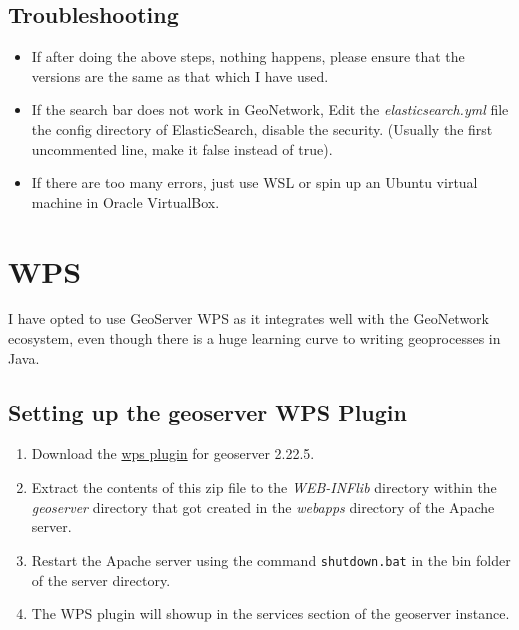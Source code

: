 \documentclass{article}
\begin{document}
        \subsection*{Troubleshooting}
            \begin{itemize}
                \item If after doing the above steps, nothing happens, please ensure that the versions are the same as that which I have used.
                \item If the search bar does not work in GeoNetwork, Edit the \emph{elasticsearch.yml} file the config directory of ElasticSearch, disable the security. (Usually the first uncommented line, make it false instead of true).
                \item If there are too many errors, just use WSL or spin up an Ubuntu virtual machine in Oracle VirtualBox.
            \end{itemize}
    \section*{WPS}
    \hspace{1.5em}I have opted to use GeoServer WPS as it integrates well with the GeoNetwork ecosystem, even though there is a huge learning curve to writing geoprocesses in Java.
        \subsection*{Setting up the geoserver WPS Plugin}
            \begin{enumerate}
                \item Download the \href{https://sourceforge.net/projects/geoserver/files/GeoServer/2.22.5/extensions/geoserver-2.22.5-wps-plugin.zip}{wps plugin} for geoserver 2.22.5.
                \item Extract the contents of this zip file to the \emph{WEB-INF\/lib} directory within the \emph{geoserver} directory that got created in the \emph{webapps} directory of the Apache server.
                \item Restart the Apache server using the command \verb|shutdown.bat| in the bin folder of the server directory.
                \item The WPS plugin will showup in the services section of the geoserver instance. 
            \end{enumerate}
\end{document}
